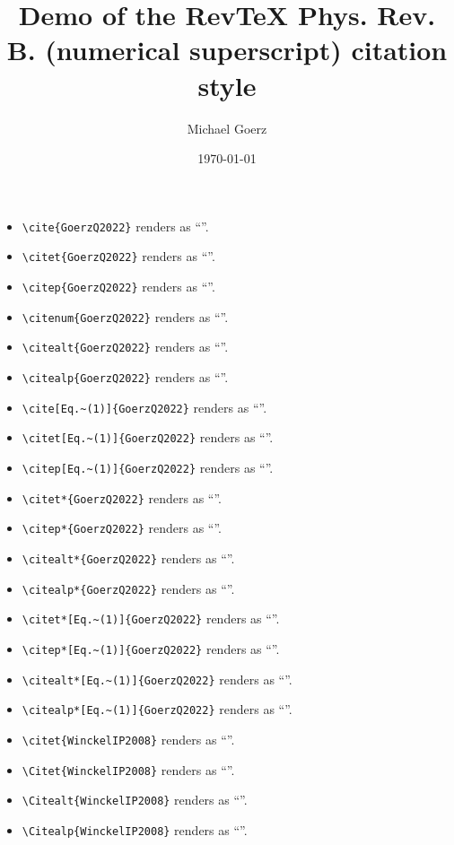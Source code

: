 \documentclass[aps,prb,onecolumn,noshowpacs,superscriptaddress,preprintnumbers,%
kamsmath,amssymb,notitlepage,letterpaper]{revtex4-1}
\def\Author{Michael Goerz}
\def\Title{Demo of the  RevTeX Phys. Rev. B. (numerical superscript) citation style}
\begin{document}
\title{\Title}
\author{\Author}
\date{\today}

\maketitle


\begin{itemize}
  \item \verb|\cite{GoerzQ2022}| renders as ``\cite{GoerzQ2022}''.
  \item \verb|\citet{GoerzQ2022}| renders as ``\citet{GoerzQ2022}''.
  \item \verb|\citep{GoerzQ2022}| renders as ``\citep{GoerzQ2022}''.
  \item \verb|\citenum{GoerzQ2022}| renders as ``''.
  \item \verb|\citealt{GoerzQ2022}| renders as ``\citealt{GoerzQ2022}''.
  \item \verb|\citealp{GoerzQ2022}| renders as ``\citealp{GoerzQ2022}''.
  \item \verb|\cite[Eq.~(1)]{GoerzQ2022}| renders as ``\cite[Eq.~(1)]{GoerzQ2022}''.
  \item \verb|\citet[Eq.~(1)]{GoerzQ2022}| renders as ``\citet[Eq.~(1)]{GoerzQ2022}''.
  \item \verb|\citep[Eq.~(1)]{GoerzQ2022}| renders as ``\citep[Eq.~(1)]{GoerzQ2022}''.
  \item \verb|\citet*{GoerzQ2022}| renders as ``\citet*{GoerzQ2022}''.
  \item \verb|\citep*{GoerzQ2022}| renders as ``\citep*{GoerzQ2022}''.
  \item \verb|\citealt*{GoerzQ2022}| renders as ``\citealt*{GoerzQ2022}''.
  \item \verb|\citealp*{GoerzQ2022}| renders as ``\citealp*{GoerzQ2022}''.
  \item \verb|\citet*[Eq.~(1)]{GoerzQ2022}| renders as ``\citet*[Eq.~(1)]{GoerzQ2022}''.
  \item \verb|\citep*[Eq.~(1)]{GoerzQ2022}| renders as ``\citep*[Eq.~(1)]{GoerzQ2022}''.
  \item \verb|\citealt*[Eq.~(1)]{GoerzQ2022}| renders as ``\citealt*[Eq.~(1)]{GoerzQ2022}''.
  \item \verb|\citealp*[Eq.~(1)]{GoerzQ2022}| renders as ``\citealp*[Eq.~(1)]{GoerzQ2022}''.
  \item \verb|\citet{WinckelIP2008}| renders as ``\citet{WinckelIP2008}''.
  \item \verb|\Citet{WinckelIP2008}| renders as ``''.
  \item \verb|\Citealt{WinckelIP2008}| renders as ``''.
  \item \verb|\Citealp{WinckelIP2008}| renders as ``''.
\end{itemize}



\end{document}
